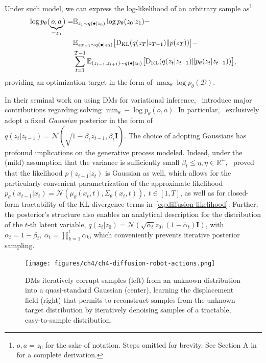 Under such model, we can express the log-likelihood of an arbitrary sample as\footnote{\( o,a = z_0 \) for the sake of notation. Steps omitted for brevity. See Section A in~\citet{hoDenoisingDiffusionProbabilistic2020} for a complete derivation.
}
\begin{align}
    \log p_\theta (\underbrace{o,a}_{= z_0}) = 
    &\mathbb{E}_{z_1 \sim q(\bullet \vert z_0)} \log p_\theta (z_0 \vert z_1) - \label{eq:diffusion-likelihood} \\
    &\mathbb{E}_{z_{T-1} \sim q(\bullet \vert z_0)} \big[ \text{D}_{\text{KL}} (q(z_T \vert z_{T-1}) \Vert p(z_T) ) \big] - \notag \\ 
    &\sum_{t=1}^{T-1} \mathbb{E}_{(z_{t-1}, z_{t+1}) \sim q(\bullet \vert z_0)} \big[ \text{D}_{\text{KL}} (q(z_t \vert z_{t-1}) \Vert p_\theta(z_t \vert z_{t-1}) ) \big], \notag
\end{align}
providing an optimization target in the form of \( \max_\theta \log p_\theta (\mathcal D) \).

In their seminal work on using DMs for variational inference,~\citet{hoDenoisingDiffusionProbabilistic2020} introduce major contributions regarding solving \( \min_\theta -\log p_\theta(o,a) \).
In particular,~\citet{hoDenoisingDiffusionProbabilistic2020} exclusively adopt a fixed \emph{Gaussian} posterior in the form of \( q(z_t \vert z_{t-1}) = \mathcal{N}(\sqrt{1-\beta_t}z_{t-1}, \beta_t \mathbf I) \).
The choice of adopting Gaussians has profound implications on the generative process modeled. 
Indeed, under the (mild) assumption that the variance is sufficiently small \( \beta_t \leq \eta, \eta \in \mathbb R^+ \),~\citet{sohl-dicksteinDeepUnsupervisedLearning2015} proved that the likelihood \( p(z_{t-1} \vert z_t) \) is Gaussian as well, which allows for the particularly convenient parametrization of the approximate likelihood \( p_\theta (x_{t-1} \vert x_t) = \mathcal N(\mu_\theta(x_t, t), \Sigma_\theta(x_t,t)), \ t \in [1,T] \), as well as for closed-form tractability of the KL-divergence terms in~\ref{eq:diffusion-likelihood}.
Further, the posterior's structure also enables an analytical description for the distribution of the \( t\)-th latent variable, \( q(z_t \vert z_0) = \mathcal N (\sqrt{\bar{\alpha}_t}z_0, (1-\bar{\alpha}_t) \mathbf{I}) \), with \( \alpha_t = 1-\beta_t, \ \bar \alpha_t = \prod_{k=1}^t \alpha_k \), which conveniently prevents iterative posterior sampling.

\begin{figure}
    \centering
    \texttt{[image: figures/ch4/ch4-diffusion-robot-actions.png]}
    \caption{DMs iteratively corrupt samples (left) from an unknown distribution into a quasi-standard Gaussian (center), learning the displacement field (right) that permits to reconstruct samples from the unknown target distribution by iteratively denoising samples of a tractable, easy-to-sample distribution.}
    \label{fig:diffusion-robot-actions}
\end{figure}

